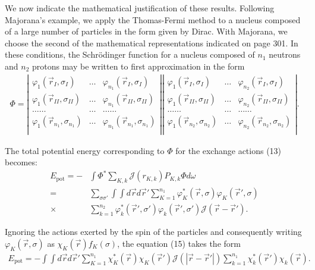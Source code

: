 \documentclass[a4paper,11pt]{article}
\newcommand{\?}[2]{#1\footnote{\textsc{Translator note}: #2}}
\newcommand{\nequ}[2]{\begin{align*}\tag{#1}#2\end{align*}}
\newcommand{\uequ}[1]{\begin{align*}#1\end{align*}}
\begin{document}
{{We now indicate the mathematical justification of these results.  Following Majorana's example, we apply the Thomas-Fermi method to a nucleus composed of a large number of particles in the form given by Dirac. With Majorana, we choose the second of the mathematical representations indicated on page 301. In these conditions, the Schr\"odinger function for a nucleus composed of $n_1$ neutrons and $n_2$ protons may be written to first approximation in the form
\uequ{
\Phi = \left|\begin{matrix}
\varphi_{1}\left(\vec{r}_I, \sigma_I\right) & \dots &
\varphi_{n_1}\left(\vec{r}_I, \sigma_I\right)\\
\varphi_{1}\left(\vec{r}_{II}, \sigma_{II}\right) & \dots &
\varphi_{n_1}\left(\vec{r}_{II}, \sigma_{II}\right)\\
\dots\dots & \dots & \dots\dots\\
\varphi_{1}\left(\vec{r}_{n_1}, \sigma_{n_1}\right) & \dots &
\varphi_{n_1}\left(\vec{r}_{n_1}, \sigma_{n_1}\right)\\
\end{matrix}
\right|
\left|\begin{matrix}
\varphi_{1}\left(\vec{r}_I, \sigma_I\right) & \dots &
\varphi_{n_2}\left(\vec{r}_I, \sigma_I\right)\\
\varphi_{1}\left(\vec{r}_{II}, \sigma_{II}\right) & \dots &
\varphi_{n_2}\left(\vec{r}_{II}, \sigma_{II}\right)\\
\dots\dots & \dots & \dots\dots\\
\varphi_{1}\left(\vec{r}_{n_2}, \sigma_{n_2}\right) & \dots &
\varphi_{n_2}\left(\vec{r}_{n_2}, \sigma_{n_2}\right)\\
\end{matrix}
\right|.
}

The total potential energy corresponding to $\Phi$ for the exchange actions (13) becomes:
\nequ{15}{
E_\text{pot} = -&\int\Phi^*\sum\limits_{K,k}\mathcal{J}(r_{K,k})P_{K,k}\Phi d\omega\\
= &\sum\limits_{\sigma\sigma'}\int\int d\vec{r}d\vec{r}'
\sum\limits_{K=1}^{n_1}\varphi_K^*\left(\vec{r},\sigma\right)
\varphi_K\left(\vec{r}',\sigma\right)\\
\times & \sum\limits_{k=1}^{n_2}\varphi_k^*\left(\vec{r}',\sigma'\right)
\varphi_k\left(\vec{r}',\sigma'\right)
\mathcal{J}\left(\vec{r} - \vec{r}'\right).
}

Ignoring the actions exerted by the spin of the particles and consequently writing $\varphi_K\left(\vec{r},\sigma\right)$ as $\chi_K(\vec{r})f_K(\sigma)$, the equation (15) takes the form
\nequ{16}{
E_\text{pot} = -\int\int d\vec{r} d\vec{r}' \sum\limits_{K=1}^{n_1}\chi_K^*(\vec{r})\chi_K(\vec{r}')\mathcal{J}\left(\left|\vec{r}-\vec{r}'\right|\right)\sum\limits_{k=1}^{n_1}\chi_k^*(\vec{r}')\chi_k(\vec{r}).
}

}}
\end{document}
